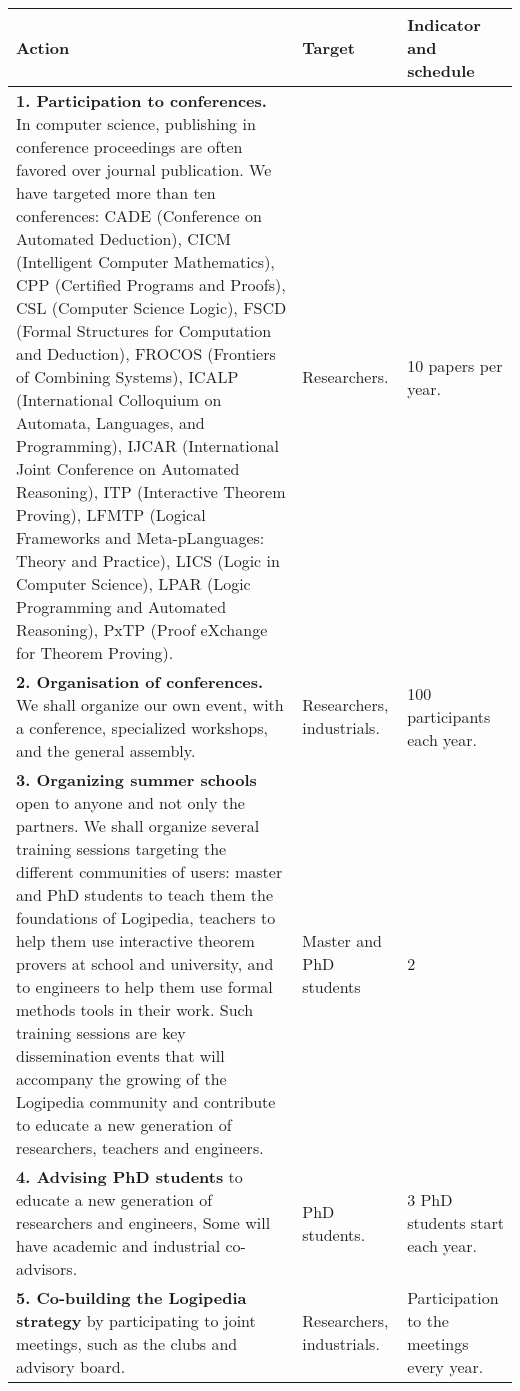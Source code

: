 \begin{longtable}{|p{}|p{}|p{}|}
\hline
{\bf Action}
&
{\bf Target}
&
{\bf Indicator and schedule}
\\
\hline
{\bf 1. Participation to conferences.}
In computer science, publishing in conference
proceedings are often favored over journal publication. We have targeted
more than ten conferences:
CADE (Conference on Automated Deduction),
CICM (Intelligent Computer Mathematics),
CPP (Certified Programs and Proofs),
CSL (Computer Science Logic),
FSCD (Formal Structures for Computation and Deduction),
FROCOS (Frontiers of Combining Systems),
ICALP (International Colloquium on Automata, Languages, and Programming),
IJCAR (International Joint Conference on Automated Reasoning),
ITP (Interactive Theorem Proving),
LFMTP (Logical Frameworks and Meta-pLanguages: Theory
and Practice), 
LICS (Logic in Computer Science),
LPAR (Logic Programming and Automated Reasoning),
PxTP (Proof eXchange for Theorem Proving).
&
Researchers.
&
10 papers per year.
\\
\hline
{\bf 2. Organisation of conferences.}
We shall organize our own event, with a conference,
specialized workshops, and the general assembly.
&
Researchers, industrials.
&
100 participants each year.
\\
\hline
{\bf 3. Organizing summer schools}
open to anyone and not only the partners.
We shall organize several training sessions targeting the
different communities of users: master and PhD students to teach them
the foundations of Logipedia, teachers to help them use interactive
theorem provers at school and university, and to engineers to help
them use formal methods tools in their work. Such training sessions
are key dissemination events that will accompany the growing of the
Logipedia community and contribute to educate a new generation of researchers,
teachers and engineers.
&
Master and PhD students
&
2
\\
\hline
    {\bf 4.
Advising PhD students} 
to educate a new generation of researchers and engineers, 
Some will have academic and industrial co-advisors.
&
PhD students.
&
3 PhD students start each year.
\\
\hline
{\bf 5. Co-building the Logipedia strategy}
by participating to joint meetings, such as
the clubs and advisory board.
&
Researchers, industrials.
&
Participation to the meetings
every year.
\\

\end{longtable}
